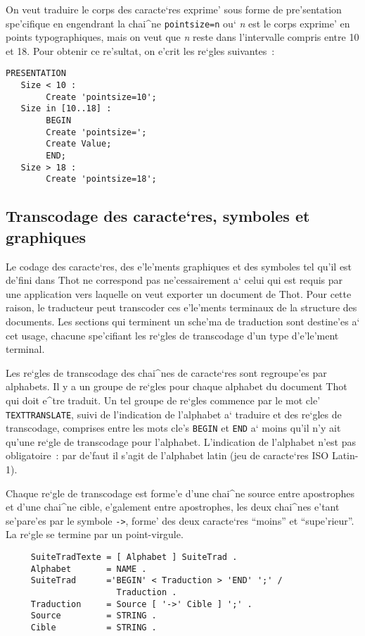 {\begin{example}
On veut traduire le corps des caracte`res exprime' sous forme de
pre'sentation spe'cifique en engendrant la chai^ne {\tt pointsize=n} ou`
{\it n} est le corps exprime' en points typographiques, mais on veut que
{\it n} reste dans l'intervalle compris entre 10 et 18. Pour obtenir ce
re'sultat, on e'crit les re`gles suivantes~:
\begin{verbatim}
PRESENTATION
   Size < 10 :
        Create 'pointsize=10';
   Size in [10..18] :
        BEGIN
        Create 'pointsize=';
        Create Value;
        END;
   Size > 18 :
        Create 'pointsize=18';
\end{verbatim}
\end{example}

\subsection{Transcodage des caracte`res, symboles et graphiques}
\label{texttrans}

Le codage des caracte`res, des e'le'ments graphiques et des symboles tel qu'il
est de'fini dans Thot ne correspond pas ne'cessairement a` celui qui est requis
par une application vers laquelle on veut exporter un document de Thot.
Pour cette raison, le traducteur peut transcoder ces e'le'ments
terminaux de la structure des documents. Les sections qui terminent
un sche'ma de traduction sont destine'es a` cet usage, chacune spe'cifiant les
re`gles de transcodage d'un type d'e'le'ment terminal.

Les re`gles de transcodage des chai^nes de caracte`res sont regroupe'es
par alphabets. Il y a un groupe de re`gles pour chaque alphabet du document
Thot qui doit e^tre traduit. Un tel groupe de re`gles commence par le
mot cle' {\tt TEXTTRANSLATE}, suivi de l'indication de l'alphabet a` traduire
et des re`gles de transcodage, comprises entre les mots cle's {\tt BEGIN} et
{\tt END} a` moins qu'il n'y ait qu'une re`gle de transcodage pour l'alphabet.
L'indication de l'alphabet n'est pas obligatoire~: par de'faut il s'agit de
l'alphabet latin (jeu de caracte`res ISO Latin-1).

Chaque re`gle de transcodage est forme'e d'une chai^ne source entre
apostrophes et d'une chai^ne cible, e'galement entre apostrophes, les
deux chai^nes e'tant se'pare'es par le symbole {\tt ->}, forme' des deux
caracte`res ``moins'' et ``supe'rieur''. La re`gle se termine par un
point-virgule.

\begin{verbatim}
     SuiteTradTexte = [ Alphabet ] SuiteTrad .
     Alphabet       = NAME .
     SuiteTrad      ='BEGIN' < Traduction > 'END' ';' /
                      Traduction .
     Traduction     = Source [ '->' Cible ] ';' .
     Source         = STRING .
     Cible          = STRING .
\end{verbatim}

}

